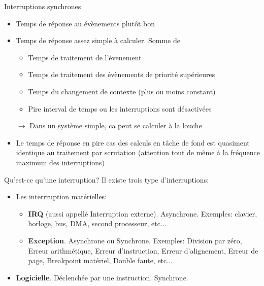 \begin{frame}{Interruptions synchrones}
  \begin{itemize} 
  \item Temps de réponse au évènements plutôt bon
  \item Temps de réponse assez simple à calculer. Somme de 
    \begin{itemize}
    \item Temps de traitement de l'évenement
    \item Temps de traitement des évènements de priorité supérieures
    \item Temps du changement de contexte (plus ou moins constant)
    \item Pire interval de temps ou les interruptions sont désactivées 
    \end{itemize} 
  \item[$\rightarrow$] Dans  un système simple, ca peut  se calculer à
    la louche
  \item Le  temps de réponse en pire  cas des calculs en  tâche de fond
    est quasiment  identique au traitement  par scrutation (attention
    tout de même à la fréquence maximum des interruptions)
  \end{itemize} 
\end{frame} 

\begin{frame}{Qu'est-ce qu'une interruption?}
  Il existe trois type d'interruptions:
  \begin{itemize} 
  \item Les interrruption matérielles:
    \begin{itemize} 
    \item   \textbf{IRQ}   (aussi   appellé   Interruption   externe).
      Asynchrone.   Exemples:  clavier,   horloge,  bus,  DMA,  second
      processeur, etc...
    \item  \textbf{Exception}.   Asynchrone  ou Synchrone.   Exemples:
      Division  par zéro,  Erreur arithmétique,  Erreur d'instruction,
      Erreur d'alignement, Erreur de page, Breakpoint matériel, Double
      faute,  etc...  

      
    \end{itemize} 
  \item \textbf{Logicielle}. Déclenchée par une instruction. Synchrone.
  \end{itemize}
\end{frame} 

